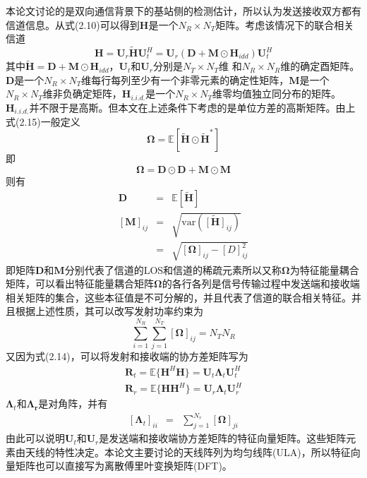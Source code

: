 \documentclass[bachelor,nocolorlinks, printoneside]{seuthesis} %
\begin{document}
\begin{Main}
本论文讨论的是双向通信背景下的基站侧的检测估计，所以认为发送接收双方都有信道信息。从式(2.10)可以得到$\mathbf{H}$是一个$N_{R} \times N_{T}$矩阵。考虑该情况下的联合相关信道
\begin{equation}\label{key}
\mathbf{H} = \mathbf{U}_{r}\tilde{\mathbf{H}}\mathbf{U}_{t}^{H} = \mathbf{U}_{r}(\mathbf{D}+\mathbf{M}\odot \mathbf{H}_{idd})\mathbf{U}_{t}^{H}
\end{equation}
其中$\tilde{\mathbf{H}} = \mathbf{D}+\mathbf{M}\odot \mathbf{H}_{idd}$，$\mathbf{U}_{t}$和$\mathbf{U}_{r}$分别是$N_{T} \times N_{T}$维 和$N_{R} \times N_{R}$维的确定酉矩阵。$\mathbf{D}$是一个$N_{R} \times N_{T}$维每行每列至少有一个非零元素的确定性矩阵，$\mathbf{M}$是一个$N_{R} \times N_{T}$维非负确定矩阵，$\mathbf{H}_{i.i.d.}$是一个$N_{R} \times N_{T}$维零均值独立同分布的矩阵。$\mathbf{H}_{i.i.d.}$并不限于是高斯。但本文在上述条件下考虑的是单位方差的高斯矩阵。由上式(2.15)一般定义
\begin{equation}\label{key}
\bm{\Omega} =\mathbb{E}[\tilde{\mathbf{H}} \odot \tilde{\mathbf{H}}^{*}]
\end{equation}
即
\begin{equation}\label{key}
\bm{\Omega} = \mathbf{D} \odot \mathbf{D} + \mathbf{M} \odot \mathbf{M}
\end{equation}
则有
\begin{eqnarray}\label{key}
\mathbf{D} & = & \mathbb{E}[\tilde{\mathbf{H}}] \\
\left[  \mathbf{M} \right]_{ij} & = & \sqrt{\mathrm{var}(\tilde{[\mathbf{H}]}_{ij})} \nonumber \\
& = & \sqrt{[\bm{\Omega}]_{ij}-[D]_{ij}^{2}}
\end{eqnarray}
即矩阵$\mathbf{D}$和$\mathbf{M}$分别代表了信道的LOS和信道的稀疏元素所以又称$\bm{\Omega} $为特征能量耦合矩阵，可以看出特征能量耦合矩阵$\bm{\Omega}$的各行各列是信号传输过程中发送端和接收端相关矩阵的集合，这些本征值是不可分解的，并且代表了信道的联合相关特征。并且根据上述性质，其可以改写发射功率约束为
\begin{equation}\label{key}
\sum_{i=1}^{N_{R}}\sum_{j=1}^{N_{T}}[\bm{\Omega}]_{ij} = N_{T}N_{R}
\end{equation}
又因为式(2.14)，可以将发射和接收端的协方差矩阵写为
\begin{eqnarray}\label{key}
\mathbf{R}_{t}=\mathbb{E}\lbrace \mathbf{H}^{H}\mathbf{H} \rbrace = \mathbf{U}_{t}\bm{\Lambda}_{t}\mathbf{U}_{t}^{H} \\
\mathbf{R}_{r}=\mathbb{E}\lbrace \mathbf{H}\mathbf{H}^{H} \rbrace = \mathbf{U}_{r}\bm{\Lambda}_{t}\mathbf{U}_{r}^{H}
\end{eqnarray}
$\bm{\Lambda}_{t}$和$\bm{\Lambda_{r}}$是对角阵，并有
\begin{eqnarray}\label{key}
[\bm{\Lambda}_{t}]_{ii} & = & \sum_{j=1}^{N_{r}} [\bm{\Omega}]_{ji} 
\end{eqnarray}
由此可以说明$\mathbf{U}_{t}$和$\mathbf{U}_{r}$是发送端和接收端协方差矩阵的特征向量矩阵。这些矩阵元素由天线的特性决定。本论文主要讨论的天线阵列为均匀线阵(ULA)，所以特征向量矩阵也可以直接写为离散傅里叶变换矩阵(DFT)。


\end{Main}
\end{document}
